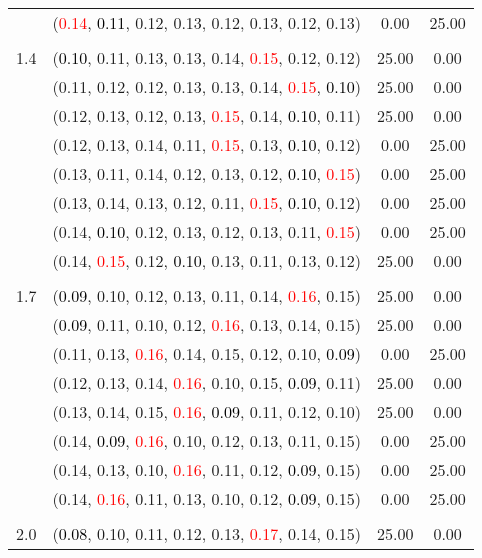 \documentclass[10pt,a4paper]{report}
\begin{document}
\begin{center}
\begin{longtable}{clcc}
			&(\textcolor{red}{0.14}, \textcolor{black}{0.11}, 0.12, 0.13, 0.12, 0.13, 0.12, 0.13)&0.00&25.00\\
		&&&\\
		1.4			&(\textcolor{black}{0.10}, 0.11, 0.13, 0.13, 0.14, \textcolor{red}{0.15}, 0.12, 0.12)&25.00&0.00\\
			&(0.11, 0.12, 0.12, 0.13, 0.13, 0.14, \textcolor{red}{0.15}, \textcolor{black}{0.10})&25.00&0.00\\
			&(0.12, 0.13, 0.12, 0.13, \textcolor{red}{0.15}, 0.14, \textcolor{black}{0.10}, 0.11)&25.00&0.00\\
			&(0.12, 0.13, 0.14, 0.11, \textcolor{red}{0.15}, 0.13, \textcolor{black}{0.10}, 0.12)&0.00&25.00\\
			&(0.13, 0.11, 0.14, 0.12, 0.13, 0.12, \textcolor{black}{0.10}, \textcolor{red}{0.15})&0.00&25.00\\
			&(0.13, 0.14, 0.13, 0.12, 0.11, \textcolor{red}{0.15}, \textcolor{black}{0.10}, 0.12)&0.00&25.00\\
			&(0.14, \textcolor{black}{0.10}, 0.12, 0.13, 0.12, 0.13, 0.11, \textcolor{red}{0.15})&0.00&25.00\\
			&(0.14, \textcolor{red}{0.15}, 0.12, \textcolor{black}{0.10}, 0.13, 0.11, 0.13, 0.12)&25.00&0.00\\
		&&&\\
		1.7			&(\textcolor{black}{0.09}, 0.10, 0.12, 0.13, 0.11, 0.14, \textcolor{red}{0.16}, 0.15)&25.00&0.00\\
			&(\textcolor{black}{0.09}, 0.11, 0.10, 0.12, \textcolor{red}{0.16}, 0.13, 0.14, 0.15)&25.00&0.00\\
			&(0.11, 0.13, \textcolor{red}{0.16}, 0.14, 0.15, 0.12, 0.10, \textcolor{black}{0.09})&0.00&25.00\\
			&(0.12, 0.13, 0.14, \textcolor{red}{0.16}, 0.10, 0.15, \textcolor{black}{0.09}, 0.11)&25.00&0.00\\
			&(0.13, 0.14, 0.15, \textcolor{red}{0.16}, \textcolor{black}{0.09}, 0.11, 0.12, 0.10)&25.00&0.00\\
			&(0.14, \textcolor{black}{0.09}, \textcolor{red}{0.16}, 0.10, 0.12, 0.13, 0.11, 0.15)&0.00&25.00\\
			&(0.14, 0.13, 0.10, \textcolor{red}{0.16}, 0.11, 0.12, \textcolor{black}{0.09}, 0.15)&0.00&25.00\\
			&(0.14, \textcolor{red}{0.16}, 0.11, 0.13, 0.10, 0.12, \textcolor{black}{0.09}, 0.15)&0.00&25.00\\
		&&&\\
		2.0			&(\textcolor{black}{0.08}, 0.10, 0.11, 0.12, 0.13, \textcolor{red}{0.17}, 0.14, 0.15)&25.00&0.00\\

\end{longtable}
\end{center}
\end{document}
